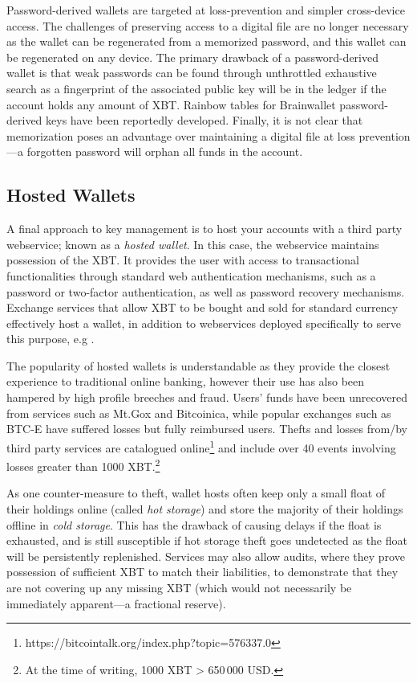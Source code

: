 Password-derived wallets are targeted at loss-prevention and simpler cross-device access. The challenges of preserving access to a digital file are no longer necessary as the wallet can be regenerated from a memorized password, and this wallet can be regenerated on any device. The primary drawback of a password-derived wallet is that weak passwords can be found through unthrottled exhaustive search as a fingerprint of the associated public key will be in the ledger if the account holds any amount of XBT. Rainbow tables for Brainwallet password-derived keys have been reportedly developed. Finally, it is not clear that memorization poses an advantage over maintaining a digital file at loss prevention---a forgotten password will orphan all funds in the account.


\subsection{Hosted Wallets} 
A final approach to key management is to host your accounts with a third party webservice; known as a \textit{hosted wallet}. In this case, the webservice maintains possession of the XBT. It provides the user with access to transactional functionalities through standard web authentication mechanisms, such as a password or two-factor authentication, as well as password recovery mechanisms. Exchange services that allow XBT to be bought and sold for standard currency effectively host a wallet, in addition to webservices deployed specifically to serve this purpose, e.g \coinbase.

The popularity of hosted wallets is understandable as they provide the closest experience to traditional online banking, however their use has also been hampered by high profile breeches and fraud. Users' funds have been unrecovered from services such as Mt.Gox and Bitcoinica, while popular exchanges such as BTC-E have suffered losses but fully reimbursed users. Thefts and losses from/by third party services are catalogued online\footnote{https://bitcointalk.org/index.php?topic=576337.0} and include over 40 events involving losses greater than 1000 XBT.\footnote{At the time of writing, 1000 XBT > 650\,000 USD.}

As one counter-measure to theft, wallet hosts often keep only a small float of their holdings online (called \textit{hot storage}) and store the majority of their holdings offline in \textit{cold storage}. This has the drawback of causing delays if the float is exhausted, and is still susceptible if hot storage theft goes undetected as the float will be persistently replenished. Services may also allow audits, where they prove possession of sufficient XBT to match their liabilities, to demonstrate that they are not covering up any missing XBT (which would not necessarily be immediately apparent---\cf a fractional reserve).  

